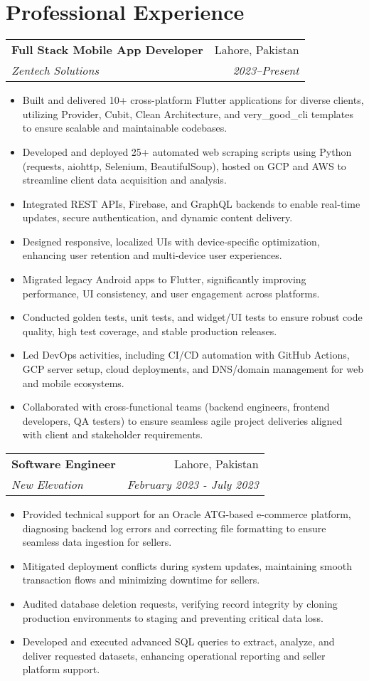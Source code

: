 \documentclass[a4paper,10pt]{article}
\makeatletter
\newcommand{\resumeSubheading}[4]{
  \item
  \begin{tabular*}{\textwidth}[t]{l@{\extracolsep{\fill}}r}
    \textbf{#1} & #2 \\
    \textit{\small#3} & \textit{\small#4} \\
  \end{tabular*}
}
\makeatother
\begin{document}
\section{Professional Experience}

\resumeSubheading
{Full Stack Mobile App Developer}{Lahore, Pakistan}
{Zentech Solutions}{2023–Present}
\begin{itemize}[leftmargin=*]
  \item Built and delivered 10+ cross-platform Flutter applications for diverse clients, utilizing Provider, Cubit, Clean Architecture, and very\_good\_cli templates to ensure scalable and maintainable codebases.
  \item Developed and deployed 25+ automated web scraping scripts using Python (requests, aiohttp, Selenium, BeautifulSoup), hosted on GCP and AWS to streamline client data acquisition and analysis.
  \item Integrated REST APIs, Firebase, and GraphQL backends to enable real-time updates, secure authentication, and dynamic content delivery.
  \item Designed responsive, localized UIs with device-specific optimization, enhancing user retention and multi-device user experiences.
  \item Migrated legacy Android apps to Flutter, significantly improving performance, UI consistency, and user engagement across platforms.
  \item Conducted golden tests, unit tests, and widget/UI tests to ensure robust code quality, high test coverage, and stable production releases.
  \item Led DevOps activities, including CI/CD automation with GitHub Actions, GCP server setup, cloud deployments, and DNS/domain management for web and mobile ecosystems.
  \item Collaborated with cross-functional teams (backend engineers, frontend developers, QA testers) to ensure seamless agile project deliveries aligned with client and stakeholder requirements.
\end{itemize}

\resumeSubheading
{Software Engineer}{Lahore, Pakistan}
{New Elevation}{February 2023 - July 2023}
\begin{itemize}[leftmargin=*]
  \item Provided technical support for an Oracle ATG-based e-commerce platform, diagnosing backend log errors and correcting file formatting to ensure seamless data ingestion for sellers.
  \item Mitigated deployment conflicts during system updates, maintaining smooth transaction flows and minimizing downtime for sellers.
  \item Audited database deletion requests, verifying record integrity by cloning production environments to staging and preventing critical data loss.
  \item Developed and executed advanced SQL queries to extract, analyze, and deliver requested datasets, enhancing operational reporting and seller platform support.
\end{itemize}
\end{document}
